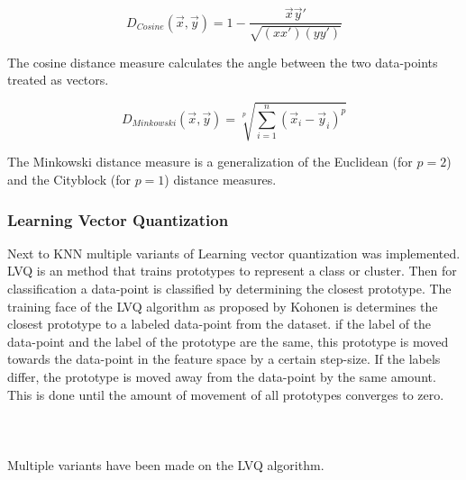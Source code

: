 \begin{equation}
D_{Cosine}(\vec{x},\vec{y})= 1 - \frac{\vec{x}\vec{y}'}{\sqrt{(xx')(yy')}}
\end{equation}

\noindent The cosine distance measure calculates the angle between the two data-points treated as vectors.

\begin{equation}
D_{Minkowski}(\vec{x},\vec{y}) = \sqrt[p]{\sum^n_{i=1}(\vec{x}_i-\vec{y}_i)^p}
\end{equation}

\noindent The Minkowski distance measure is a generalization of the Euclidean (for $p=2$) and the Cityblock (for $p=1$) distance measures.

\subsubsection{Learning Vector Quantization}


Next to KNN multiple variants of Learning vector quantization was implemented. LVQ is an method that trains prototypes to represent a class or cluster. Then for classification a data-point is classified by determining the closest prototype. The training face of the LVQ algorithm as proposed by Kohonen is determines the closest prototype to a labeled data-point from the dataset. if the label of the data-point and the label of the prototype are the same, this prototype is moved towards the data-point in the feature space by a certain step-size. If the labels differ, the prototype is moved away from the data-point by the same amount. This is done until the amount of movement of all prototypes converges to zero.
\\\\
\\\\

Multiple variants have been made on the LVQ algorithm.

